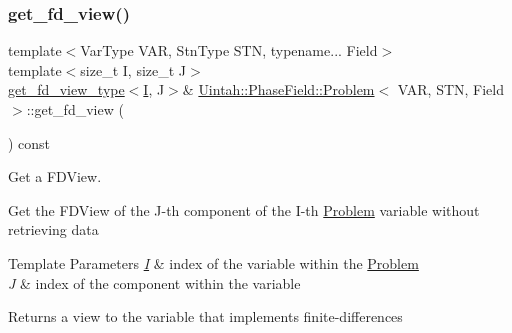 \subsubsection{\texorpdfstring{get\+\_\+fd\+\_\+view()}{get\_fd\_view()}\hspace{0.1cm}{\footnotesize\ttfamily [3/4]}}
{\footnotesize\ttfamily template$<$Var\+Type V\+AR, Stn\+Type S\+TN, typename... Field$>$ \\
template$<$size\+\_\+t I, size\+\_\+t J$>$ \\
\hyperlink{classUintah_1_1PhaseField_1_1Problem_a89c10e32620acbe3cae959667a1cdd3e}{get\+\_\+fd\+\_\+view\+\_\+type}$<$\hyperlink{structUintah_1_1PhaseField_1_1I}{I}, J$>$\& \hyperlink{classUintah_1_1PhaseField_1_1Problem}{Uintah\+::\+Phase\+Field\+::\+Problem}$<$ V\+AR, S\+TN, Field $>$\+::get\+\_\+fd\+\_\+view (\begin{DoxyParamCaption}{ }\end{DoxyParamCaption}) const\hspace{0.3cm}{\ttfamily [inline]}}



Get a F\+D\+View. 

Get the F\+D\+View of the J-\/th component of the I-\/th \hyperlink{classUintah_1_1PhaseField_1_1Problem}{Problem} variable without retrieving data


\begin{DoxyTemplParams}{Template Parameters}
{\em \hyperlink{structUintah_1_1PhaseField_1_1I}{I}} & index of the variable within the \hyperlink{classUintah_1_1PhaseField_1_1Problem}{Problem} \\
\hline
{\em J} & index of the component within the variable \\
\hline
\end{DoxyTemplParams}
\begin{DoxyReturn}{Returns}
a view to the variable that implements finite-\/differences 
\end{DoxyReturn}
\mbox{\label{classUintah_1_1PhaseField_1_1Problem_a43e532eaf9aff9d7cfdec7190ab2b0f8}} 

